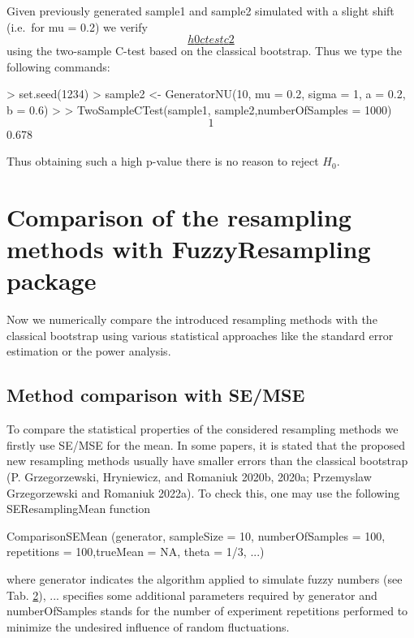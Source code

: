 Given previously generated sample1 and sample2 simulated with a slight
shift (i.e.~for mu = 0.2) we verify
\protect\hyperlink{h0ctestc2}{\[h0ctestc2\]} using the two-sample C-test based on the
classical bootstrap. Thus we type the following commands:

\begin{example}
\textgreater{} set.seed(1234) \textgreater{} sample2 \textless- GeneratorNU(10, mu = 0.2, sigma = 1, a
= 0.2, b = 0.6) \textgreater{} \textgreater{} TwoSampleCTest(sample1, sample2,numberOfSamples =
1000) \[1\] 0.678
\end{example}

Thus obtaining such a high p-value there is no reason to reject \(H_0\).

\hypertarget{comparison-of-the-resampling-methods-with-fuzzyresampling-package}{%
\section{Comparison of the resampling methods with FuzzyResampling package}\label{comparison-of-the-resampling-methods-with-fuzzyresampling-package}}

Now we numerically compare the introduced resampling methods with the
classical bootstrap using various statistical approaches like the
standard error estimation or the power analysis.

\hypertarget{method-comparison-with-semse}{%
\subsection{Method comparison with SE/MSE}\label{method-comparison-with-semse}}

To compare the statistical properties of the considered resampling
methods we firstly use SE/MSE for the mean. In some papers, it is stated
that the proposed new resampling methods usually have smaller errors
than the classical bootstrap
(P. Grzegorzewski, Hryniewicz, and Romaniuk 2020b, 2020a; Przemyslaw Grzegorzewski and Romaniuk 2022a).
To check this, one may use the following SEResamplingMean function

\begin{example}
ComparisonSEMean (generator, sampleSize = 10, numberOfSamples = 100,
repetitions = 100,trueMean = NA, theta = 1/3, ...)
\end{example}

where generator indicates the algorithm applied to simulate fuzzy
numbers (see Tab. \protect\hyperlink{tab100}{2}), ... specifies some additional parameters required
by generator and numberOfSamples stands for the number of experiment
repetitions performed to minimize the undesired influence of random
fluctuations.

